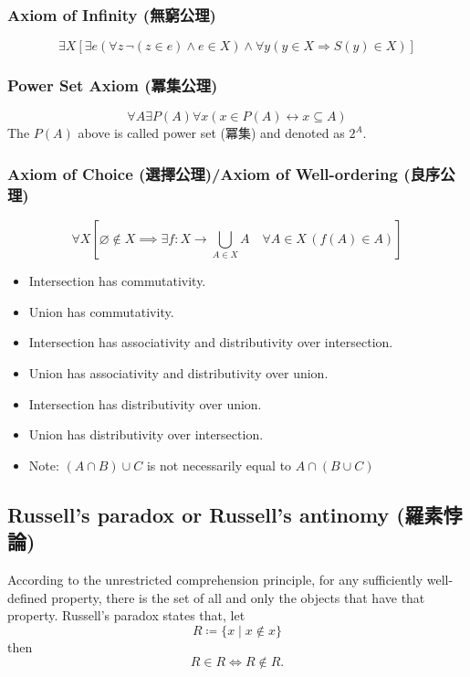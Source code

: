 \documentclass[a4paper,12pt]{report}
\begin{document}
\subsubsection{Axiom of Infinity (無窮公理)}
\[ \exists X\left[\exists e(\forall z\,\neg (z\in e)\land e\in X)\land \forall y(y\in X\Rightarrow S(y)\in X)\right]\]
\subsubsection{Power Set Axiom (冪集公理)}
\[\forall A \exists P(A) \forall x (x \in P(A) \leftrightarrow x \subseteq A)\]
The $P(A)$ above is called power set (冪集) and denoted as $2^A$.
\subsubsection{Axiom of Choice (選擇公理)/Axiom of Well-ordering (良序公理)}
\[ \forall X\left[\varnothing \notin X\implies \exists f\colon X\rightarrow \bigcup _{A\in X}A\quad \forall A\in X\,(f(A)\in A)\right]\]
\begin{itemize}
\item Intersection has commutativity.
\item Union has commutativity.
\item Intersection has associativity and distributivity over intersection.
\item Union has associativity and distributivity over union.
\item Intersection has distributivity over union.
\item Union has distributivity over intersection.
\item Note: $(A\cap B)\cup C$ is not necessarily equal to $A\cap (B\cup C)$
\end{itemize}
\subsection{Russell's paradox or Russell's antinomy (羅素悖論)}
According to the unrestricted comprehension principle, for any sufficiently well-defined property, there is the set of all and only the objects that have that property. Russell's paradox states that, let
\[R\coloneq\{x\mid x\not \in x\}\]
then
\[R\in R\iff R\not \in R.\]
\end{document}

